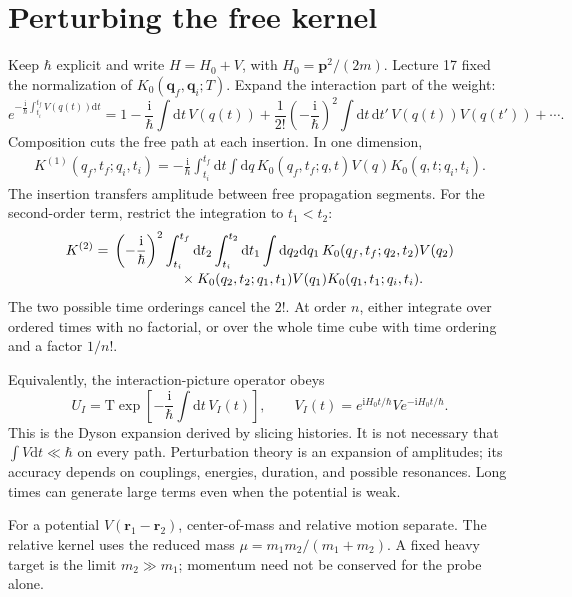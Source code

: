 \documentclass[11pt]{article}
\newcommand{\dd}{\mathrm d}
\newcommand{\ii}{\mathrm i}
\newcommand{\Tord}{\mathrm T}
\begin{document}
\section{Perturbing the free kernel}
Keep \(\hbar\) explicit and write \(H=H_0+V\), with
\(H_0=\bm p^2/(2m)\). Lecture 17 fixed the normalization of
\(K_0(\bm q_f,\bm q_i;T)\). Expand the interaction part of the weight:
\begin{equation}
 e^{-\frac{\ii}{\hbar}\int_{t_i}^{t_f}V(q(t))\dd t}
 =1-\frac{\ii}{\hbar}\int\dd t\,V(q(t))
 +\frac1{2!}\left(-\frac{\ii}{\hbar}\right)^2
 \int\dd t\,\dd t'\,V(q(t))V(q(t'))+\cdots.
\end{equation}
Composition cuts the free path at each insertion. In one dimension,
\begin{align}
 K^{(1)}(q_f,t_f;q_i,t_i)
 =-\frac{\ii}{\hbar}\int_{t_i}^{t_f}\dd t\int\dd q\,
 K_0(q_f,t_f;q,t)V(q)K_0(q,t;q_i,t_i).                \label{eq:bornkernel}
\end{align}
The insertion transfers amplitude between free propagation segments.
For the second-order term, restrict the integration to \(t_1<t_2\):
\begin{align}
 K^{(2)}={}&\left(-\frac{\ii}{\hbar}\right)^2
 \int_{t_i}^{t_f}\dd t_2\int_{t_i}^{t_2}\dd t_1
 \int\dd q_2\dd q_1\,
 K_0(q_f,t_f;q_2,t_2)V(q_2)\nonumber\\[-2pt]
 &\hspace{17mm}\times K_0(q_2,t_2;q_1,t_1)V(q_1)
 K_0(q_1,t_1;q_i,t_i).
\end{align}
The two possible time orderings cancel the \(2!\). At order \(n\),
either integrate over ordered times with no factorial, or over the
whole time cube with time ordering and a factor \(1/n!\).

Equivalently, the interaction-picture operator obeys
\begin{equation}
 U_I=\Tord\exp\!\left[-\frac{\ii}{\hbar}\int\dd t\,V_I(t)\right],
 \qquad V_I(t)=e^{\ii H_0t/\hbar}Ve^{-\ii H_0t/\hbar}.
\end{equation}
This is the Dyson expansion derived by slicing histories. It is not
necessary that \(\int V\dd t\ll\hbar\) on every path. Perturbation
theory is an expansion of amplitudes; its accuracy depends on couplings,
energies, duration, and possible resonances. Long times can generate
large terms even when the potential is weak.

\begin{remarkbox}
For a potential \(V(\bm r_1-\bm r_2)\), center-of-mass and relative
motion separate. The relative kernel uses the reduced mass
\(\mu=m_1m_2/(m_1+m_2)\). A fixed heavy target is the limit
\(m_2\gg m_1\); momentum need not be conserved for the probe alone.
\end{remarkbox}
\end{document}
